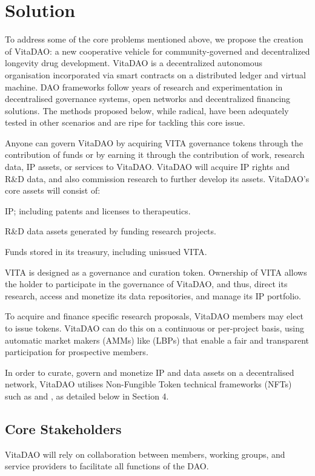 \documentclass[10pt,letterpaper]{article}
\newenvironment{tight_enumerate}{
\begin{enumerate}
  \setlength{\itemsep}{0pt}
  \setlength{\parskip}{0pt}
}{\end{enumerate}}
\begin{document}
\section{Solution}
To address some of the core problems mentioned above, we propose the creation of VitaDAO: a new cooperative vehicle for community-governed and decentralized longevity drug development. VitaDAO is a decentralized autonomous organisation incorporated via smart contracts on a distributed ledger and virtual machine. DAO frameworks follow years of research and experimentation in decentralised governance systems, open networks and decentralized financing solutions. The methods proposed below, while radical, have been adequately tested in other scenarios and are ripe for tackling this core issue.

Anyone can govern VitaDAO by acquiring VITA governance tokens through the contribution of funds or by earning it through the contribution of work, research data, IP assets, or services to VitaDAO. VitaDAO will acquire IP rights and R\&D data, and also commission research to further develop its assets. VitaDAO’s core assets will consist of: 

\begin{tight_enumerate}
\item IP; including patents and licenses to therapeutics. 
\item R\&D data assets generated by funding research projects. 
\item Funds stored in its treasury, including unissued VITA.
\end{tight_enumerate}

VITA is designed as a governance and curation token. Ownership of VITA allows the holder to participate in the governance of VitaDAO, and thus, direct its research, access and monetize its data repositories, and manage its IP portfolio.

To acquire and finance specific research proposals, VitaDAO members may elect to issue tokens. VitaDAO can do this on a continuous or per-project basis, using automatic market makers (AMMs) like  (LBPs) that enable a fair and transparent participation for prospective members. 

In order to curate, govern and monetize IP and data assets on a decentralised network, VitaDAO utilises Non-Fungible Token technical frameworks (NFTs) such as  and , as detailed below in Section 4.

\subsection{Core Stakeholders}
VitaDAO will rely on collaboration between members, working groups, and service providers to facilitate all functions of the DAO.  
\end{document}
